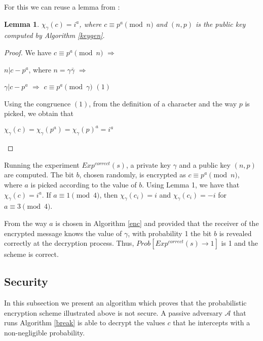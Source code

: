 \documentclass[11pt, a4paper, twoside, openright]{report}
\newtheorem{lemma}{Lemma}
\begin{document}
		For this we can reuse a lemma from \cite{p}: 
		\begin{lemma} \cite{p}
		 	$\chi_{\gamma}(c) = i^a$, where $c \equiv p^a \pmod{n}$ and $(n,p)$ is the public 
		 	key computed by Algorithm \ref{keygen}. 	
		\end{lemma}
		\begin{proof}
			We have $c \equiv p^a \pmod{n}$ $\Rightarrow$
			
			\hspace{15mm} $n | c - p^a $, where $n =\gamma \bar{\gamma}$ $\Rightarrow$
			
			\hspace{15mm} $\gamma | c - p^a $ $\Rightarrow$ 	$c \equiv p^a  \pmod{\gamma} $  $(1)$
			
			Using the congruence $(1)$, from the definition of a character and the way $p$ is picked, we obtain that 
			
			\begin{center}
			$\chi_{\gamma}(c) = \chi_{\gamma}(p^a) = \chi_{\gamma}(p)^a =  i^a$
			\end{center}	 
			
		\end{proof}
		
		Running the experiment $Exp^{correct}(s)$, a private key $\gamma$ and a public key $(n,p)$ are computed. 
		The bit $b$, chosen randomly, is encrypted as
		$c \equiv p^a \pmod{n} $, where $a$ is picked according to the value of $b$. Using Lemma 1, we have that $\chi_{\gamma}(c) = i^a$. 
		If $a \equiv 1 \pmod{4} $, then $\chi_{\gamma}(c_i) = i$ and $\chi_{\gamma}(c_i) = -i$ for  $a \equiv 3 \pmod{4} $. 
		
		From the way $a$ is chosen in Algorithm \ref{enc} and provided that the receiver of the encrypted message knows the value of
		$\gamma$, with probability 1 the bit $b$ is revealed correctly at the decryption process. Thus, $Prob [ Exp^{correct}(s) \rightarrow 1]$ 
		is 1 and the scheme is correct. 
		
		
	\subsection{Security}
	
		In this subsection we present an algorithm which proves that the probabilistic encryption scheme illustrated above is not secure. 
		A passive adversary $\mathcal{A}$ that runs Algorithm \ref{break} is able to decrypt the values $c$ that he intercepts with a 
		non-negligible probability.   
		
\end{document}
